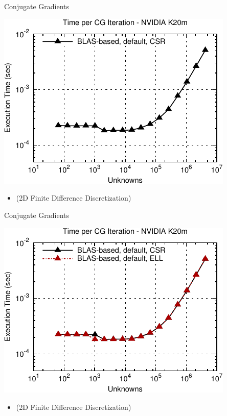 \begin{frame}[fragile]{Conjugate Gradients}
 \begin{block}{}
 \begin{center}
  \vspace*{-0.5cm}
  \includegraphics[width=0.85\textwidth]{figures/cg-k20m-0}
 \end{center}

 \begin{itemize}
  \item   \vspace*{-0.3cm} {\small (2D Finite Difference Discretization)}
 \end{itemize}
 \end{block}   
\end{frame}

\begin{frame}[fragile]{Conjugate Gradients}
 \begin{block}{}
 \begin{center}
  \vspace*{-0.5cm}
  \includegraphics[width=0.85\textwidth]{figures/cg-k20m-1}
 \end{center}

 \begin{itemize}
  \item   \vspace*{-0.3cm} {\small (2D Finite Difference Discretization)}
 \end{itemize}
 \end{block}   
\end{frame}

